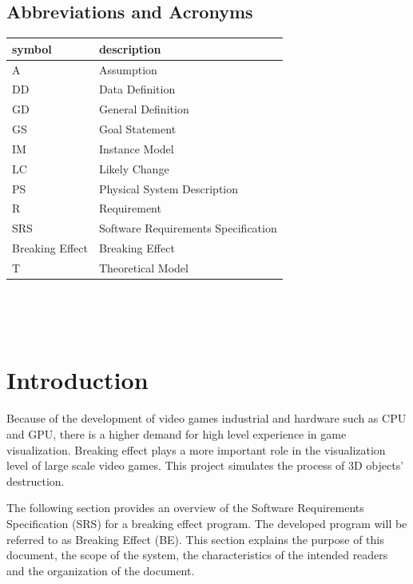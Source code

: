 \documentclass[12pt]{article}
\newcommand{\progname}{Breaking Effect} %
\begin{document}
\subsection{Abbreviations and Acronyms}

\renewcommand{\arraystretch}{1.2}
\begin{tabular}{l l} 
  \toprule		
  \textbf{symbol} & \textbf{description}\\
  \midrule 
  A & Assumption\\
  DD & Data Definition\\
  GD & General Definition\\
  GS & Goal Statement\\
  IM & Instance Model\\
  LC & Likely Change\\
  PS & Physical System Description\\
  R & Requirement\\
  SRS & Software Requirements Specification\\
  \progname{} & Breaking Effect\\
  T & Theoretical Model\\
  \bottomrule
\end{tabular}\\

\newpage

\tableofcontents

~\newpage


\section{Introduction}

Because of the development of video games industrial and hardware such as CPU
and GPU, there is a higher demand for high level experience in game
visualization. Breaking effect plays a more important role in the visualization
level of large scale video games.   This project simulates the process of 3D objects’ destruction.

The following section provides an overview of the Software Requirements Specification (SRS) for a breaking effect program. The developed program will be referred to as Breaking Effect (BE). This section explains the purpose of this document, the scope of the system, the characteristics of the intended readers and the organization of the document.

\end{document}
